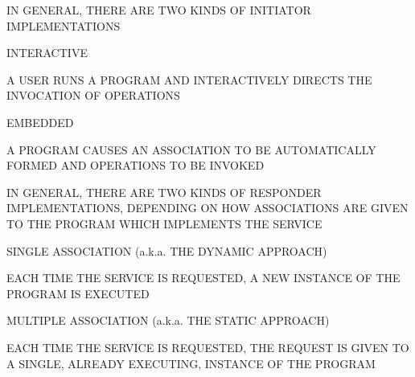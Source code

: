 \begin{bwslide}

\begin{nrtc}
\item	IN GENERAL, THERE ARE TWO KINDS OF INITIATOR IMPLEMENTATIONS

\item	INTERACTIVE
    \begin{nrtc}
    \item	A USER RUNS A PROGRAM AND INTERACTIVELY DIRECTS THE
		INVOCATION OF OPERATIONS
    \end{nrtc}

\item	EMBEDDED
    \begin{nrtc}
    \item	A PROGRAM CAUSES AN ASSOCIATION TO BE AUTOMATICALLY FORMED
		AND OPERATIONS TO BE INVOKED
    \end{nrtc}
\end{nrtc}
\end{bwslide}


\begin{bwslide}

\begin{nrtc}
\item	IN GENERAL, THERE ARE TWO KINDS OF RESPONDER IMPLEMENTATIONS,
	DEPENDING ON HOW ASSOCIATIONS ARE GIVEN TO THE PROGRAM WHICH
	IMPLEMENTS THE SERVICE

\item	SINGLE ASSOCIATION (a.k.a. THE DYNAMIC APPROACH)
    \begin{nrtc}
    \item	EACH TIME THE SERVICE IS REQUESTED, A NEW INSTANCE OF
		THE PROGRAM IS EXECUTED
    \end{nrtc}

\item	MULTIPLE ASSOCIATION (a.k.a. THE STATIC APPROACH)
    \begin{nrtc}
    \item	EACH TIME THE SERVICE IS REQUESTED, THE REQUEST IS GIVEN TO A
		SINGLE, ALREADY EXECUTING, INSTANCE OF THE PROGRAM
    \end{nrtc}
\end{nrtc}
\end{bwslide}


